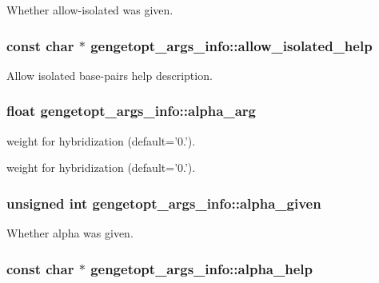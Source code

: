Whether allow-\/isolated was given. 

\hypertarget{structgengetopt__args__info_accb0df971eca4af7ced072388135ed2b}{
\subsubsection[{allow\+\_\+isolated\+\_\+help}]{\setlength{\rightskip}{0pt plus 5cm}const char $\ast$ gengetopt\+\_\+args\+\_\+info\+::allow\+\_\+isolated\+\_\+help}}\label{structgengetopt__args__info_accb0df971eca4af7ced072388135ed2b}


Allow isolated base-\/pairs help description. 

\hypertarget{structgengetopt__args__info_a502d24814b53a2197444e3ef7f5af837}{
\subsubsection[{alpha\+\_\+arg}]{\setlength{\rightskip}{0pt plus 5cm}float gengetopt\+\_\+args\+\_\+info\+::alpha\+\_\+arg}}\label{structgengetopt__args__info_a502d24814b53a2197444e3ef7f5af837}


weight for hybridization (default='0.'). 

weight for hybridization (default='0.'). \hypertarget{structgengetopt__args__info_a2843ef7fb6a39e43eccc1088e4d63f6f}{
\subsubsection[{alpha\+\_\+given}]{\setlength{\rightskip}{0pt plus 5cm}unsigned int gengetopt\+\_\+args\+\_\+info\+::alpha\+\_\+given}}\label{structgengetopt__args__info_a2843ef7fb6a39e43eccc1088e4d63f6f}


Whether alpha was given. 

\hypertarget{structgengetopt__args__info_a9c0b0c04fb015f10016df0054a8ce4f6}{
\subsubsection[{alpha\+\_\+help}]{\setlength{\rightskip}{0pt plus 5cm}const char $\ast$ gengetopt\+\_\+args\+\_\+info\+::alpha\+\_\+help}}\label{structgengetopt__args__info_a9c0b0c04fb015f10016df0054a8ce4f6}


